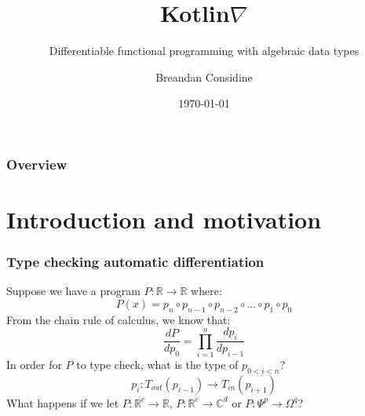 \documentclass{beamer}
\title{Kotlin\texorpdfstring{$\nabla$}{}}
\subtitle{Differentiable functional programming with algebraic data types}
\author{Breandan Considine}
\institute[UdeM]{
Universit\'e de Montr\'eal \\
\medskip
\textit{breandan.considine@umontreal.ca}
}
\date{\today}
\begin{document}
    \begin{frame}
        \titlepage
    \end{frame}

    \begin{frame}
        \frametitle{Overview}
        \tableofcontents
    \end{frame}

    \section{Introduction and motivation}\label{sec:first-section}


    \begin{frame}
        \frametitle{Type checking automatic differentiation}
        Suppose we have a program $P: \mathbb{R}\rightarrow\mathbb{R}$ where:
        \begin{equation}
            P(x)=p_n \circ p_{n-1} \circ p_{n-2} \circ \dots \circ p_1 \circ p_0
        \end{equation}
        From the chain rule of calculus, we know that:
        \begin{equation}
            \frac{dP}{dp_0} = {\displaystyle \prod_{i=1}^{n} \frac{dp_{i}}{dp_{i-1}}}
        \end{equation}
        In order for $P$ to type check, what is the type of $p_{0<i<n}$?
        \begin{equation}
            p_i: T_{out}(p_{i-1}) \rightarrow T_{in}(p_{i+1})
        \end{equation}
        What happens if we let $P: \mathbb{R}^c\rightarrow\mathbb{R}$, $P: \mathbb{R}^c\rightarrow\mathbb{C}^d$  or $P: \Psi^p\rightarrow\Omega^q$?
    \end{frame}

\end{document}
